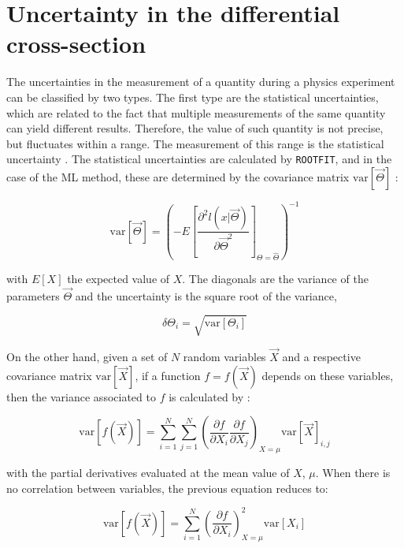 \section{Uncertainty in the differential cross-section}
The uncertainties in the measurement of a quantity during a physics experiment can be classified by two types. The first type are the statistical uncertainties, which are related to the fact that multiple measurements of the same quantity can yield different results. Therefore, the value of such quantity is not precise, but fluctuates within a range. The measurement of this range is the statistical uncertainty \cite{sinervo2003definition}. The statistical uncertainties are calculated by \verb|ROOTFIT|, and in the case of the ML method, these are determined by the covariance matrix $\mathrm{var}[\vec{\Theta}]$ \cite{vsirca2016probability}:

\begin{equation}
	\mathrm{var}[\vec{\Theta}] = 
	\left(-E\left[ \frac{\partial^2 l(x | \vec{\Theta}) }{\partial \vec{\Theta} ^2}\right]_{\Theta = \hat{\Theta}}\right)^{-1}
\end{equation}

with $E[X]$ the expected value of $X$. The diagonals are the variance of the parameters $\vec{\Theta}$ and the uncertainty is the square root of the variance, 

\begin{equation}
	\delta \Theta_i = \sqrt{\mathrm{var}[\Theta_i]}
\end{equation}

On the other hand, given a set of $N$ random variables $\vec{X}$ and a respective covariance matrix $\mathrm{var}[\vec{X}]$, if a function $f = f(\vec{X})$ depends on these variables, then the variance associated to $f$ is calculated by \cite{vsirca2016probability}:

\begin{equation}
	\mathrm{var}[f(\vec{X})] = \sum_{i=1}^N \sum_{j=1}^N \left(\frac{\partial f}{\partial X_i} \frac{\partial f}{\partial X_j} \right)_{X = \mu} \mathrm{var}[\vec{X}]_{i,j}
\end{equation}

with the partial derivatives evaluated at the mean value of $X$, $\mu$. When there is no correlation between variables, the previous equation reduces to:

\begin{equation}
	\label{totaluncertainty}
	\mathrm{var}[f(\vec{X})] = \sum_{i=1}^N  \left(\frac{\partial f}{\partial X_i}\right)^2_{X = \mu} \mathrm{var}[X_i]
\end{equation}

